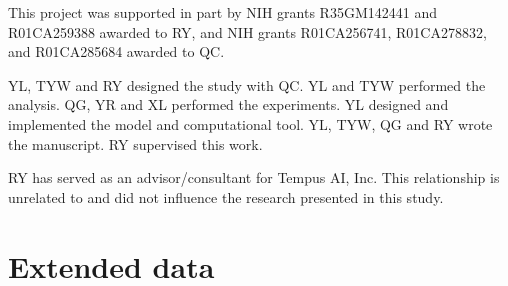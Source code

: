 \documentclass[pdflatex,sn-nature, lineno]{sn-jnl}%
\begin{document}

This project was supported in part by NIH grants R35GM142441 and R01CA259388 awarded to RY, and NIH grants R01CA256741, R01CA278832, and R01CA285684 awarded to QC.


YL, TYW and RY designed the study with QC. YL and TYW performed the analysis. QG, YR and XL performed the experiments. YL designed and implemented the model and computational tool. YL, TYW, QG and RY wrote the manuscript. RY supervised this work.


RY has served as an advisor/consultant for Tempus AI, Inc. This relationship is unrelated to and did not influence the research presented in this study.

\backmatter

\begin{appendices}
    \printglossaries
\end{appendices}


\newpage

\section{Extended data}

\renewcommand{\figurename}{Extended Data Fig.}
\renewcommand{\tablename}{Extended Data Table}
\end{document}
